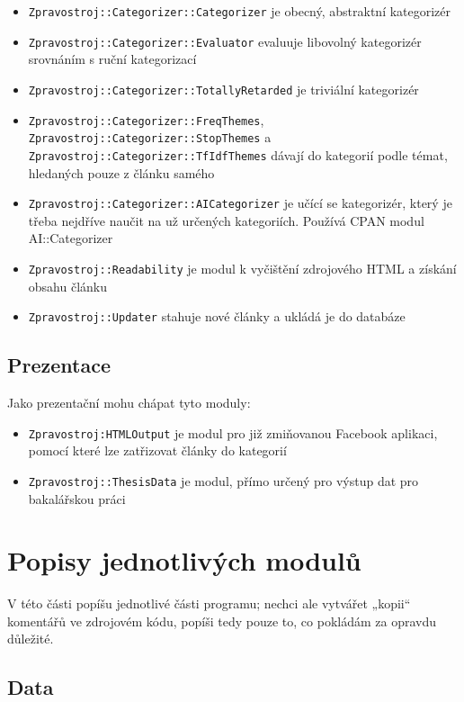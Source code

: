 \documentclass[12pt,a4paper]{report}
\def\uv#1{„#1“}
\begin{document}
\begin{itemize}
	\item \texttt{Zpravostroj::Categorizer::Categorizer} je obecný, abstraktní kategorizér
	\item \texttt{Zpravostroj::Categorizer::Evaluator} evaluuje libovolný kategorizér srovnáním s ruční kategorizací
	\item \texttt{Zpravostroj::Categorizer::TotallyRetarded} je triviální kategorizér
	\item \texttt{Zpravostroj::Categorizer::FreqThemes}, \texttt{Zpravostroj::Categorizer::StopThemes} a \texttt{Zpravostroj::Categorizer::TfIdfThemes} dávají do kategorií podle témat, hledaných pouze z článku samého
	\item \texttt{Zpravostroj::Categorizer::AICategorizer} je učící se kategorizér, který je třeba nejdříve naučit na už určených kategoriích. Používá CPAN modul AI::Categorizer
	\item \texttt{Zpravostroj::Readability} je modul k vyčištění zdrojového HTML a získání obsahu článku
	\item \texttt{Zpravostroj::Updater} stahuje nové články a ukládá je do databáze
\end{itemize}

\section{Prezentace}
Jako prezentační mohu chápat tyto moduly:
\begin{itemize}
	\item \texttt{Zpravostroj:HTMLOutput} je modul pro již zmiňovanou Facebook aplikaci, pomocí které lze zatřizovat články do kategorií
	\item \texttt{Zpravostroj::ThesisData} je modul, přímo určený pro výstup dat pro bakalářskou práci
\end{itemize}

\chapter{Popisy jednotlivých modulů}

V této části popíšu jednotlivé části programu; nechci ale vytvářet \uv{kopii} komentářů ve zdrojovém kódu, popíši tedy pouze to, co pokládám za opravdu důležité.

\section{Data}
		
\end{document}
